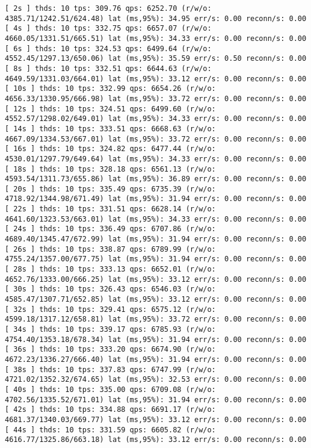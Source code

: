 \documentclass{article}
\begin{document}
\begin{verbatim}
[ 2s ] thds: 10 tps: 309.76 qps: 6252.70 (r/w/o: 4385.71/1242.51/624.48) lat (ms,95%): 34.95 err/s: 0.00 reconn/s: 0.00
[ 4s ] thds: 10 tps: 332.75 qps: 6657.07 (r/w/o: 4660.05/1331.51/665.51) lat (ms,95%): 34.33 err/s: 0.00 reconn/s: 0.00
[ 6s ] thds: 10 tps: 324.53 qps: 6499.64 (r/w/o: 4552.45/1297.13/650.06) lat (ms,95%): 35.59 err/s: 0.50 reconn/s: 0.00
[ 8s ] thds: 10 tps: 332.51 qps: 6644.63 (r/w/o: 4649.59/1331.03/664.01) lat (ms,95%): 33.12 err/s: 0.00 reconn/s: 0.00
[ 10s ] thds: 10 tps: 332.99 qps: 6654.26 (r/w/o: 4656.33/1330.95/666.98) lat (ms,95%): 33.72 err/s: 0.00 reconn/s: 0.00
[ 12s ] thds: 10 tps: 324.51 qps: 6499.60 (r/w/o: 4552.57/1298.02/649.01) lat (ms,95%): 34.33 err/s: 0.00 reconn/s: 0.00
[ 14s ] thds: 10 tps: 333.51 qps: 6668.63 (r/w/o: 4667.09/1334.53/667.01) lat (ms,95%): 33.72 err/s: 0.00 reconn/s: 0.00
[ 16s ] thds: 10 tps: 324.82 qps: 6477.44 (r/w/o: 4530.01/1297.79/649.64) lat (ms,95%): 34.33 err/s: 0.00 reconn/s: 0.00
[ 18s ] thds: 10 tps: 328.18 qps: 6561.13 (r/w/o: 4593.54/1311.73/655.86) lat (ms,95%): 36.89 err/s: 0.00 reconn/s: 0.00
[ 20s ] thds: 10 tps: 335.49 qps: 6735.39 (r/w/o: 4718.92/1344.98/671.49) lat (ms,95%): 31.94 err/s: 0.00 reconn/s: 0.00
[ 22s ] thds: 10 tps: 331.51 qps: 6628.14 (r/w/o: 4641.60/1323.53/663.01) lat (ms,95%): 34.33 err/s: 0.00 reconn/s: 0.00
[ 24s ] thds: 10 tps: 336.49 qps: 6707.86 (r/w/o: 4689.40/1345.47/672.99) lat (ms,95%): 31.94 err/s: 0.00 reconn/s: 0.00
[ 26s ] thds: 10 tps: 338.87 qps: 6789.99 (r/w/o: 4755.24/1357.00/677.75) lat (ms,95%): 31.94 err/s: 0.00 reconn/s: 0.00
[ 28s ] thds: 10 tps: 333.13 qps: 6652.01 (r/w/o: 4652.76/1333.00/666.25) lat (ms,95%): 33.12 err/s: 0.00 reconn/s: 0.00
[ 30s ] thds: 10 tps: 326.43 qps: 6546.03 (r/w/o: 4585.47/1307.71/652.85) lat (ms,95%): 33.12 err/s: 0.00 reconn/s: 0.00
[ 32s ] thds: 10 tps: 329.41 qps: 6575.12 (r/w/o: 4599.18/1317.12/658.81) lat (ms,95%): 33.72 err/s: 0.00 reconn/s: 0.00
[ 34s ] thds: 10 tps: 339.17 qps: 6785.93 (r/w/o: 4754.40/1353.18/678.34) lat (ms,95%): 31.94 err/s: 0.00 reconn/s: 0.00
[ 36s ] thds: 10 tps: 333.20 qps: 6674.90 (r/w/o: 4672.23/1336.27/666.40) lat (ms,95%): 31.94 err/s: 0.00 reconn/s: 0.00
[ 38s ] thds: 10 tps: 337.83 qps: 6747.99 (r/w/o: 4721.02/1352.32/674.65) lat (ms,95%): 32.53 err/s: 0.00 reconn/s: 0.00
[ 40s ] thds: 10 tps: 335.00 qps: 6709.08 (r/w/o: 4702.56/1335.52/671.01) lat (ms,95%): 31.94 err/s: 0.00 reconn/s: 0.00
[ 42s ] thds: 10 tps: 334.88 qps: 6691.17 (r/w/o: 4681.37/1340.03/669.77) lat (ms,95%): 33.12 err/s: 0.00 reconn/s: 0.00
[ 44s ] thds: 10 tps: 331.59 qps: 6605.82 (r/w/o: 4616.77/1325.86/663.18) lat (ms,95%): 33.12 err/s: 0.00 reconn/s: 0.00

\end{verbatim}
\end{document}
